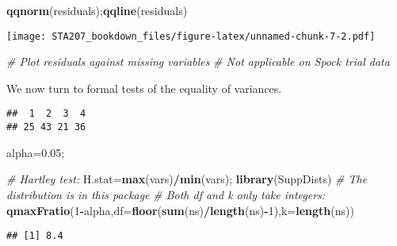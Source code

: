 \documentclass[12pt,]{book}
\newenvironment{Shaded}{\begin{snugshade}}{\end{snugshade}}
\newcommand{\KeywordTok}[1]{\textcolor[rgb]{0.13,0.29,0.53}{\textbf{#1}}}
\newcommand{\DataTypeTok}[1]{\textcolor[rgb]{0.13,0.29,0.53}{#1}}
\newcommand{\DecValTok}[1]{\textcolor[rgb]{0.00,0.00,0.81}{#1}}
\newcommand{\FloatTok}[1]{\textcolor[rgb]{0.00,0.00,0.81}{#1}}
\newcommand{\CommentTok}[1]{\textcolor[rgb]{0.56,0.35,0.01}{\textit{#1}}}
\newcommand{\OperatorTok}[1]{\textcolor[rgb]{0.81,0.36,0.00}{\textbf{#1}}}
\newcommand{\NormalTok}[1]{#1}
\begin{document}
\begin{Shaded}
\begin{Highlighting}[]
\KeywordTok{qqnorm}\NormalTok{(residuals);}\KeywordTok{qqline}\NormalTok{(residuals)}
\end{Highlighting}
\end{Shaded}

\texttt{[image: STA207\_bookdown\_files/figure-latex/unnamed-chunk-7-2.pdf]}

\begin{Shaded}
\begin{Highlighting}[]
\CommentTok{# Plot residuals against missing variables }
\CommentTok{# Not applicable on Spock trial data }
\end{Highlighting}
\end{Shaded}

We now turn to formal tests of the equality of variances.

\begin{Shaded}
\end{Shaded}

\begin{verbatim}
##  1  2  3  4 
## 25 43 21 36
\end{verbatim}

\begin{Shaded}
\begin{Highlighting}[]
\NormalTok{alpha=}\FloatTok{0.05}\NormalTok{;}

\CommentTok{# Hartley test:}
\NormalTok{H.stat=}\KeywordTok{max}\NormalTok{(vars)}\OperatorTok{/}\KeywordTok{min}\NormalTok{(vars);}
\KeywordTok{library}\NormalTok{(SuppDists) }\CommentTok{# The distribution is in this package}
\CommentTok{# Both df and k only take integers:}
\KeywordTok{qmaxFratio}\NormalTok{(}\DecValTok{1}\OperatorTok{-}\NormalTok{alpha,}\DataTypeTok{df=}\KeywordTok{floor}\NormalTok{(}\KeywordTok{sum}\NormalTok{(ns)}\OperatorTok{/}\KeywordTok{length}\NormalTok{(ns)}\OperatorTok{-}\DecValTok{1}\NormalTok{),}\DataTypeTok{k=}\KeywordTok{length}\NormalTok{(ns))}
\end{Highlighting}
\end{Shaded}

\begin{verbatim}
## [1] 8.4
\end{verbatim}
\end{document}
